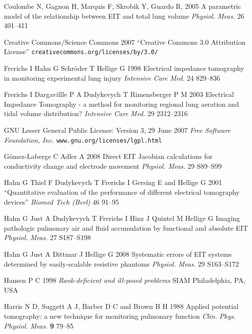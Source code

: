 \documentclass[12pt]{iopart}
\begin{document}
\item[]
Coulombe N, Gagnon H, Marquis F, Skrobik Y, Guardo R, 2005
A parametric model of the relationship between EIT and total lung volume
{\em Physiol. Meas.}
26 401--411


\item[]
Creative Commons/Science Commons 2007
``Creative Commons 3.0 Attribution License''
\verb+creativecommons.org/licenses/by/3.0/+

\item[]
Frerichs I  Hahn G Schr\"oder T Hellige G 1998
Electrical impedance tomography in
monitoring experimental lung injury
{\em Intensive Care Med.}
24 829--836

\item[]
Frerichs I Dargavillle P A Dudykevych T Rimensberger P M 2003
Electrical Impedance Tomography - a method for monitoring
regional lung aeration and tidal volume distribution?
{\em  Intensive Care Med.}
29 2312--2316

\item[]
GNU Lesser General Public License: Version 3, 29 June 2007
{\em Free Software Foundation, Inc.}
\verb+www.gnu.org/licenses/lgpl.html+

G\'omez-Laberge C Adler A 2008
Direct EIT Jacobian calculations for conductivity change and electrode movement
{\em Physiol. Meas.}
29 S89--S99


\item[]
Hahn G Thiel F Dudykevych T Frerichs I Gersing E
and Hellige G 2001
``Quantitative evaluation of the performance of
different electrical tomography devices''
{\em  Biomed Tech (Berl)}
46 91--95

\item[]
Hahn G Just A Dudykevych T Frerichs I Hinz J  Quintel M Hellige G
Imaging pathologic pulmonary air and fluid accumulation by
 functional and absolute EIT
{\em Physiol. Meas.}
27 S187--S198

\item[]
Hahn G Just A Dittmar J  Hellige G 2008
Systematic errors of EIT systems determined by easily-scalable
 resistive phantoms
{\em Physiol. Meas.}
 29 S163--S172


\item[]
Hansen P C 1998 {\em Rank-deficient and ill-posed problems}
SIAM Philadelphia, PA, USA

\item[]
Harris N D, Suggett A J, Barber D C and Brown B H 1988 Applied
potential tomography: a new technique for monitoring pulmonary
function {\em Clin. Phys. Physiol. Meas.} {\bf 9} 79--85
\end{document}
